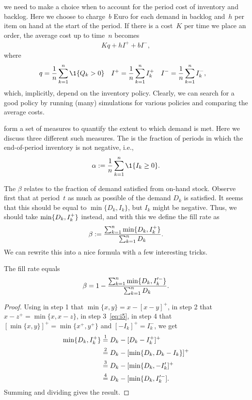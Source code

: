 \documentclass[stochastic-or.tex]{subfiles}
\begin{document}
 we need to make a choice when to account for the period cost of inventory and backlog.
Here we choose to charge~$b$ Euro for each demand in backlog  and~$h$ per item on hand at the start of the period.
If there is a cost~$K$ per time we place an order, the average cost up to time~$n$ becomes
\begin{align*}
K q + h I^+ + b I^-,
\end{align*}
where
\begin{align*}
  q&= \frac 1n \sum_{k=1}^n \1{Q_{k}>0}  &
  I^+ &= \frac 1n \sum_{k=1}^n \IL_k^+  &
  I^- &= \frac 1n \sum_{k=1}^n \IL_k^-,
\end{align*}
which, implicitly, depend on the inventory policy.
Clearly, we can search for a good policy by running (many) simulations for various policies and comparing the average costs.

 form a set of  measures to quantify the extent to which demand is met. Here we discuss three different such measures.
The  is the fraction of periods in which the end-of-period inventory is not negative, i.e.,
\begin{equation*}
\alpha :=   \frac 1n \sum_{k=1}^n \1{\IL_k \geq 0}.
\end{equation*}

The  $\beta$ relates to the fraction of demand satisfied from on-hand stock.
Observe first that at period~$t$ as much as possible of the demand $D_{k}$ is satisfied.
It seems that this should be equal to $\min\{D_{k}, I_{k}\}$, but $I_{k}$ might be negative.
Thus, we should take $\min\{D_{k}, I_{k}^{+}\}$ instead, and with this we define the fill rate as
\begin{equation}\label{eq:c24}
    \beta :=  \frac{\sum_{k=1}^n \min\{D_k, I_k^{+}\}}{\sum_{k=1}^n D_k}.
\end{equation}
We can rewrite this into  a nice formula with a few interesting tricks.

\begin{lemma}\label{lem:4}
The fill rate equals
\begin{equation*}
    \beta = 1 - \frac{\sum_{k=1}^n \min\{D_k, I_k'^-\}}{\sum_{k=1}^n D_k}.
\end{equation*}
\end{lemma}
\begin{proof}
Using in step 1 that $\min\{x, y\} = x - [x-y]^{+}$, in step 2 that  $x - z^{+} = \min\{x, x-z\}$, in step 3~\cref{eq:i5}, in step 4 that $[\min\{x, y\}]^{+} = \min\{x^+, y^{+}\}$ and $[-I_k]^{+} = I_k^{-}$, we get
\begin{align*}
   \min\{D_{k}, I_{k}^{+}\}
  &\stackrel1= D_k - [D_k-I_{k}^{+}]^{+}\\
  &\stackrel2= D_k - [\min\{D_k, D_{k}-I_{k}\}]^{+}\\
  &\stackrel3= D_k - [\min\{D_k, -I_{k}']^{+}\\
  &\stackrel4= D_k - [\min\{D_k, I_{k}'^{-}].
\end{align*}
Summing and dividing gives the result.
\end{proof}
\end{document}
